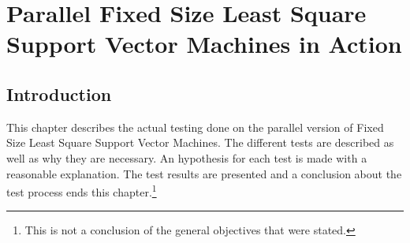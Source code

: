 
\chapter{Parallel Fixed Size Least Square Support Vector Machines in Action }
\section{Introduction}
This chapter describes the actual testing done on the parallel version of Fixed Size Least Square Support Vector Machines.
The different tests are described as well as why they are necessary.
An hypothesis for each test is made with a reasonable explanation.
The test results are presented and a conclusion about the test process ends this chapter.\footnote{This is not a conclusion of the general objectives that were stated.}
